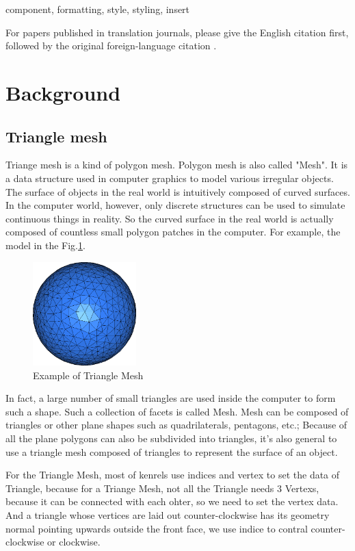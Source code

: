 \documentclass[conference]{IEEEtran}
\begin{document}
\begin{IEEEkeywords}
component, formatting, style, styling, insert
\end{IEEEkeywords}
For papers published in translation journals, please give the English 
citation first, followed by the original foreign-language citation \cite{b6}.

\section{Background}
\subsection{Triangle mesh}
Triange mesh is a kind of polygon mesh. Polygon mesh is also called "Mesh". It is a data structure used in computer graphics to model various irregular objects. The surface of objects in the real world is intuitively composed of curved surfaces. In the computer world, however, only discrete structures can be used to simulate continuous things in reality. So the curved surface in the real world is actually composed of countless small polygon patches in the computer. For example, the model in the Fig.\ref{Triangle Mesh_sphere_surface}. 
\begin{figure}[ht]
    \caption{Example of Triangle Mesh}
    \label{Triangle Mesh_sphere_surface}
    \centering 
    \includegraphics[width=4cm]{Triangle Mesh_sphere_surface.png}
\end{figure}

In fact, a large number of small triangles are used inside the computer to form such a shape. Such a collection of facets is called Mesh. Mesh can be composed of triangles or other plane shapes such as quadrilaterals, pentagons, etc.; Because of all the plane polygons can also be subdivided into triangles, it's also general to use a triangle mesh composed of triangles to represent the surface of an object.

For the Triangle Mesh, most of kenrels use indices and vertex to set the data of Triangle, because for a Triange Mesh, not all the Triangle needs 3 Vertexs, because it can be connected with each ohter, so we need to set the vertex data. And a triangle whose vertices are laid out counter-clockwise has its geometry normal pointing upwards outside the front face, we use indice to contral counter-clockwise or clockwise.
\end{document}
